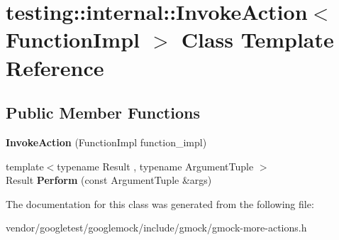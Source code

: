 \hypertarget{classtesting_1_1internal_1_1InvokeAction}{}\section{testing\+:\+:internal\+:\+:Invoke\+Action$<$ Function\+Impl $>$ Class Template Reference}
\label{classtesting_1_1internal_1_1InvokeAction}
\subsection*{Public Member Functions}
\begin{DoxyCompactItemize}
\item 
{\bfseries Invoke\+Action} (Function\+Impl function\+\_\+impl)\hypertarget{classtesting_1_1internal_1_1InvokeAction_a786ce772624fc87a31891f465df7ce61}{}\label{classtesting_1_1internal_1_1InvokeAction_a786ce772624fc87a31891f465df7ce61}

\item 
{\footnotesize template$<$typename Result , typename Argument\+Tuple $>$ }\\Result {\bfseries Perform} (const Argument\+Tuple \&args)\hypertarget{classtesting_1_1internal_1_1InvokeAction_af357ce691795b3520de1fda4ab8af8b2}{}\label{classtesting_1_1internal_1_1InvokeAction_af357ce691795b3520de1fda4ab8af8b2}

\end{DoxyCompactItemize}


The documentation for this class was generated from the following file\+:\begin{DoxyCompactItemize}
\item 
vendor/googletest/googlemock/include/gmock/gmock-\/more-\/actions.\+h\end{DoxyCompactItemize}
